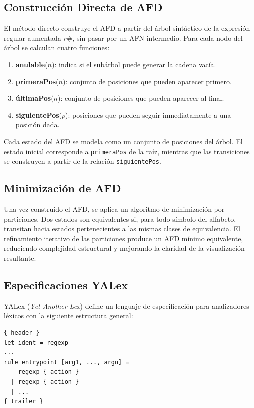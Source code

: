 \documentclass[12pt,a4paper]{article}
\begin{document}
\subsection{Construcción Directa de AFD}

El método directo construye el AFD a partir del árbol sintáctico de la expresión regular aumentada $r\#$, sin pasar por un AFN intermedio. Para cada nodo del árbol se calculan cuatro funciones:

\begin{enumerate}[leftmargin=2em]
  \item \textbf{anulable}($n$): indica si el subárbol puede generar la cadena vacía.
  \item \textbf{primeraPos}($n$): conjunto de posiciones que pueden aparecer primero.
  \item \textbf{últimaPos}($n$): conjunto de posiciones que pueden aparecer al final.
  \item \textbf{siguientePos}($p$): posiciones que pueden seguir inmediatamente a una posición dada.
\end{enumerate}

Cada estado del AFD se modela como un conjunto de posiciones del árbol. El estado inicial corresponde a \texttt{primeraPos} de la raíz, mientras que las transiciones se construyen a partir de la relación \texttt{siguientePos}.

\subsection{Minimización de AFD}

Una vez construido el AFD, se aplica un algoritmo de minimización por particiones. Dos estados son equivalentes si, para todo símbolo del alfabeto, transitan hacia estados pertenecientes a las mismas clases de equivalencia. El refinamiento iterativo de las particiones produce un AFD mínimo equivalente, reduciendo complejidad estructural y mejorando la claridad de la visualización resultante.

\subsection{Especificaciones YALex}

YALex (\emph{Yet Another Lex}) define un lenguaje de especificación para analizadores léxicos con la siguiente estructura general:

\begin{lstlisting}[style=yalexstyle, title={\small Estructura general de una especificación YALex}]
{ header }
let ident = regexp
...
rule entrypoint [arg1, ..., argn] =
    regexp { action }
  | regexp { action }
  | ...
{ trailer }
\end{lstlisting}
\end{document}
